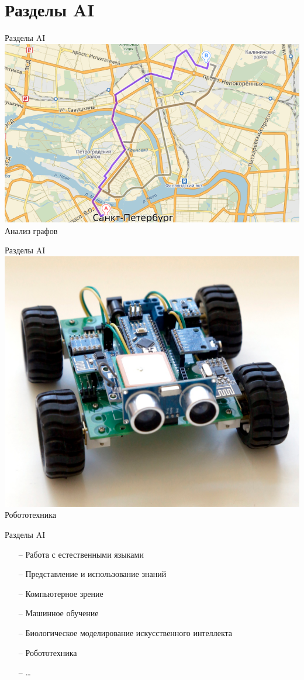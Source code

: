 \documentclass[10pt]{beamer}
\begin{document}
\section{Разделы AI}

\begin{frame}{Разделы AI}
  \centering
  \includegraphics[width=0.8 \linewidth, height=0.8 \textheight, keepaspectratio]{images/maps}\\
	Анализ графов
\end{frame}

\begin{frame}{Разделы AI}
  \centering
  \includegraphics[width=0.8 \linewidth, height=0.8 \textheight, keepaspectratio]{images/robot}\\
	Робототехника
\end{frame}

\begin{frame}{Разделы AI}
	\begin{itemize}
	  \item[--] Работа с естественными языками
		\item[--] Представление и использование знаний
		\item[--] Компьютерное зрение
		\item[--] Машинное обучение
		\item[--] Биологическое моделирование искусственного интеллекта
		\item[--] Робототехника
		\item[--] \ldots
	\end{itemize}
\end{frame}
\end{document}
